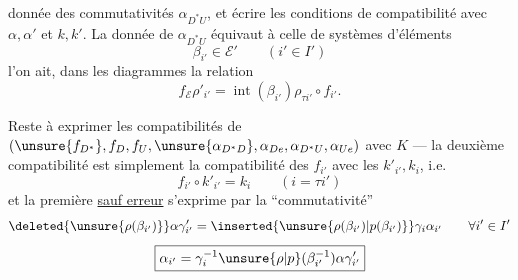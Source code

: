 
donnée des commutativités $\alpha_{D^*U}$, et écrire les conditions de compatibilité avec $\alpha,\alpha'$ et $k,k'$. La donnée de $\alpha_{D^*U}$ équivaut à celle de systèmes d'éléments
\[
\boxed{\beta_{i'}\in\mathcal E'}\qquad(i'\in I')
\]
 l'on ait, dans les diagrammes
la relation
\[
f_{\mathcal E}\rho'_{i'}=\operatorname{int}(\beta_{i'})\rho_{\tau i'}\circ f_{i'}.
\]

Reste à exprimer les  compatibilités  de
$(\unsure{f_{D^*}},f_D,f_U,\unsure{\alpha_{D^*D}},\alpha_{De},\alpha_{D^*U},\alpha_{Ue})$
  avec $K$ --- la deuxième compatibilité est simplement la compatibilité des $f_{i'}$ avec les $k'_{i'},k_i$, i.e.
\[
f_{i'}\circ k'_{i'}=k_i\qquad(i=\tau i')
\]
et la première \uline{sauf erreur} s'exprime par la ``commutativité''
\[
\deleted{\unsure{\rho(\beta_{i'})}}\alpha\gamma'_{i'}
 =\inserted{\unsure{\rho(\beta_{i'})|p(\beta_{i'})}}\gamma_i\alpha_{i'}
 \qquad\forall i'\in I'
\]
\[
\boxed{\alpha_{i'}=\gamma_i^{-1}\unsure{\rho|p}(\beta_{i'}^{-1})\alpha\gamma'_{i'}}
\]


